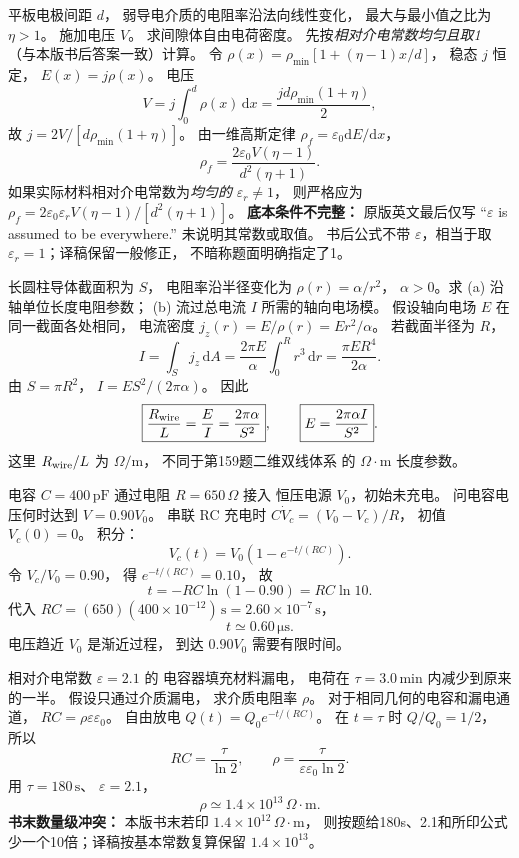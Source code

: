 平板电极间距 $d$，
弱导电介质的电阻率沿法向线性变化，
最大与最小值之比为 $\eta>1$。
施加电压 $V$。
求间隙体自由电荷密度。
\exsolution
先按\emph{相对介电常数均匀且取1}
（与本版书后答案一致）计算。
令 $\rho(x)=\rho_{\min}
[1+(\eta-1)x/d]$，
稳态 $j$ 恒定，
$E(x)=j\rho(x)$。
电压
\[
V=j\int_0^d\rho(x)\,\mathrm dx
=\frac{jd\rho_{\min}(1+\eta)}2,
\]
故
$j=2V/[d\rho_{\min}(1+\eta)]$。
由一维高斯定律
$\rho_f=\varepsilon_0\mathrm dE/\mathrm dx$，
\[
\boxed{\rho_f=
\frac{2\varepsilon_0V(\eta-1)}
{d^2(\eta+1)}}.
\]
如果实际材料相对介电常数为\emph{均匀的}
$\varepsilon_r\ne1$，
则严格应为
$\rho_f=2\varepsilon_0\varepsilon_rV
(\eta-1)/[d^2(\eta+1)]$。
\excheck \textbf{底本条件不完整：}
原版英文最后仅写
“$\varepsilon$ is assumed to be everywhere.”
未说明其常数或取值。
书后公式不带 $\varepsilon$，相当于取
$\varepsilon_r=1$；译稿保留一般修正，
不暗称题面明确指定了1。

长圆柱导体截面积为 $S$，
电阻率沿半径变化为
$\rho(r)=\alpha/r^2$，
$\alpha>0$。求 (a) 沿轴单位长度电阻参数；
(b) 流过总电流 $I$ 所需的轴向电场模。
\exsolution
假设轴向电场 $E$ 在同一截面各处相同，
电流密度
$j_z(r)=E/\rho(r)=Er^2/\alpha$。
若截面半径为 $R$，
\[
I=\int_Sj_z\,\mathrm dA
=\frac{2\pi E}{\alpha}\int_0^Rr^3\,\mathrm dr
=\frac{\pi ER^4}{2\alpha}.
\]
由 $S=\pi R^2$，
$I=ES^2/(2\pi\alpha)$。
因此
\[
\boxed{\frac{R_{\rm wire}}{L}
=\frac E I=\frac{2\pi\alpha}{S^2}},
\qquad
\boxed{E=\frac{2\pi\alpha I}{S^2}}.
\]
\excheck 这里 $R_{\rm wire}/L$ 为
$\Omega/\mathrm m$，
不同于第159题二维双线体系
的 $\Omega\cdot\mathrm m$ 长度参数。

电容 $C=400\,\mathrm{pF}$
通过电阻 $R=650\,\Omega$ 接入
恒压电源 $V_0$，初始未充电。
问电容电压何时达到 $V=0.90V_0$。
\exsolution
串联 RC 充电时
$C\dot V_c=(V_0-V_c)/R$，
初值 $V_c(0)=0$。
积分：
\[
V_c(t)=V_0(1-e^{-t/(RC)}).
\]
令 $V_c/V_0=0.90$，
得 $e^{-t/(RC)}=0.10$，
故
\[
\boxed{t=-RC\ln(1-0.90)=RC\ln10}.
\]
代入
$RC=(650)(400\times10^{-12})\,\mathrm s
=2.60\times10^{-7}\,\mathrm s$，
\[
\boxed{t\simeq0.60\,\mathrm{\mu s}}.
\]
\excheck 电压趋近 $V_0$ 是渐近过程，
到达 $0.90V_0$ 需要有限时间。

相对介电常数 $\varepsilon=2.1$ 的
电容器填充材料漏电，
电荷在 $\tau=3.0\,\mathrm{min}$
内减少到原来的一半。
假设只通过介质漏电，
求介质电阻率 $\rho$。
\exsolution
对于相同几何的电容和漏电通道，
$RC=\rho\varepsilon\varepsilon_0$。
自由放电
$Q(t)=Q_0e^{-t/(RC)}$。
在 $t=\tau$ 时 $Q/Q_0=1/2$，
所以
\[
RC=\frac{\tau}{\ln2},
\qquad
\boxed{\rho=
\frac{\tau}{\varepsilon\varepsilon_0\ln2}}.
\]
用 $\tau=180\,\mathrm s$、
$\varepsilon=2.1$，
\[
\boxed{\rho\simeq1.4\times10^{13}\,\Omega\cdot\mathrm m}.
\]
\excheck \textbf{书末数量级冲突：}
本版书末若印
$1.4\times10^{12}\,\Omega\cdot\mathrm m$，
则按题给180s、2.1和所印公式
少一个10倍；译稿按基本常数复算保留
$1.4\times10^{13}$。

